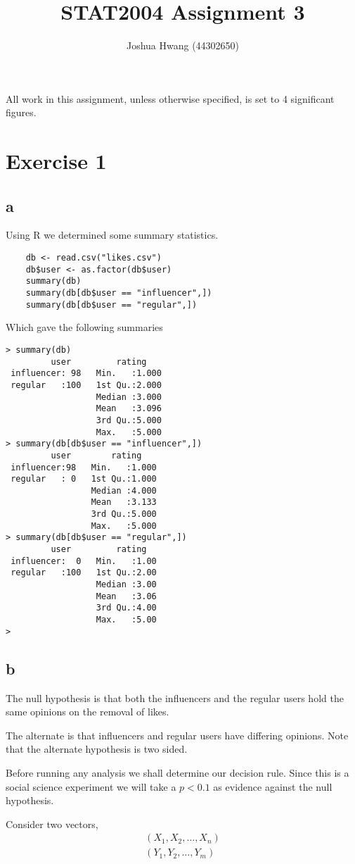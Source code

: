 \documentclass{article}
\title{STAT2004 Assignment 3}
\author{Joshua Hwang (44302650)}
\begin{document}
All work in this assignment, unless otherwise specified, is set to 4 significant
figures.

\section{Exercise 1}
\subsection{a}
Using R we determined some summary statistics.

\begin{verbatim}
    db <- read.csv("likes.csv")
    db$user <- as.factor(db$user)
    summary(db)
    summary(db[db$user == "influencer",])
    summary(db[db$user == "regular",])
\end{verbatim}

Which gave the following summaries
\begin{verbatim}
> summary(db)
         user         rating     
 influencer: 98   Min.   :1.000  
 regular   :100   1st Qu.:2.000  
                  Median :3.000  
                  Mean   :3.096  
                  3rd Qu.:5.000  
                  Max.   :5.000  
> summary(db[db$user == "influencer",])
         user        rating     
 influencer:98   Min.   :1.000  
 regular   : 0   1st Qu.:1.000  
                 Median :4.000  
                 Mean   :3.133  
                 3rd Qu.:5.000  
                 Max.   :5.000  
> summary(db[db$user == "regular",])
         user         rating    
 influencer:  0   Min.   :1.00  
 regular   :100   1st Qu.:2.00  
                  Median :3.00  
                  Mean   :3.06  
                  3rd Qu.:4.00  
                  Max.   :5.00  
> 
\end{verbatim}

\subsection{b}
The null hypothesis is that both the influencers and the regular users hold the
same opinions on the removal of likes.

The alternate is that influencers and regular users have differing opinions.
Note that the alternate hypothesis is two sided.

Before running any analysis we shall determine our decision rule.
Since this is a social science experiment we will take a $p < 0.1$ as evidence
against the null hypothesis.

Consider two vectors,
\begin{align*}
    (X_1, X_2, \ldots, X_n) \\
    (Y_1, Y_2, \ldots, Y_m) \\
\end{align*}
\end{document}
